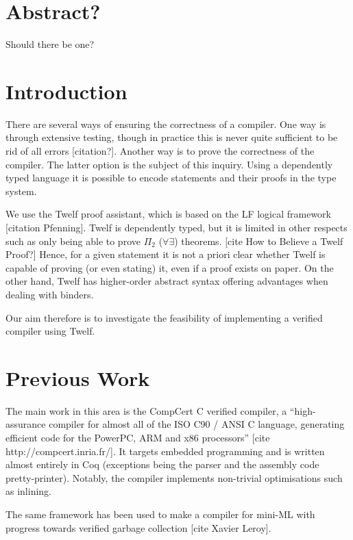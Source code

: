 \section{Abstract?}
Should there be one?

\section{Introduction}

There are several ways of ensuring the correctness of a compiler.
One way is through extensive testing, though in practice this is never quite sufficient to be rid of all errors [citation?].
Another way is to prove the correctness of the compiler.
The latter option is the subject of this inquiry.
Using a dependently typed language it is possible to encode statements and their proofs in the type system.

We use the Twelf proof assistant, which is based on the LF logical framework [citation Pfenning].
Twelf is dependently typed, but it is limited in other respects such as only being able to prove $\Pi_2$ ($\forall \exists$) theorems. [cite How to Believe a Twelf Proof?]
Hence, for a given statement it is not a priori clear whether Twelf is capable of proving (or even stating) it, even if a proof exists on paper.
On the other hand, Twelf has higher-order abstract syntax offering advantages when dealing with binders.

Our aim therefore is to investigate the feasibility of implementing a verified compiler using Twelf.

\section{Previous Work}

The main work in this area is the CompCert C verified compiler, a ``high-assurance compiler for almost all of the ISO C90 / ANSI C language, generating efficient code for the PowerPC, ARM and x86 processors'' [cite http://compcert.inria.fr/].
It targets embedded programming and is written almost entirely in Coq (exceptions being the parser and the assembly code pretty-printer).
Notably, the compiler implements non-trivial optimisations such as inlining.

The same framework has been used to make a compiler for mini-ML with progress towards verified garbage collection [cite Xavier Leroy].

